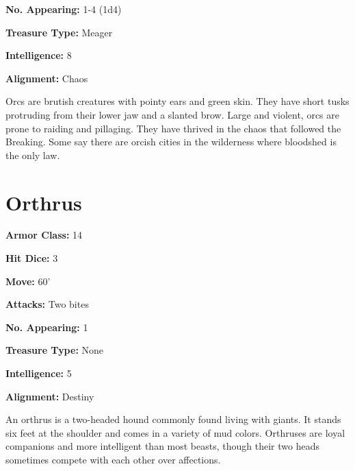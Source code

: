 \begin{multicols}{2}
\textbf{No. Appearing:} 1-4 (1d4)

\textbf{Treasure Type:} Meager

\textbf{Intelligence:} 8

\textbf{Alignment:} Chaos

Orcs are brutish creatures with pointy ears and green skin. They
have short tusks protruding from their lower jaw and a slanted
brow. Large and violent, orcs are prone to raiding and pillaging.
They have thrived in the chaos that followed the Breaking. Some
say there are orcish cities in the wilderness where bloodshed is
the only law.

\section{Orthrus}

\textbf{Armor Class:} 14

\textbf{Hit Dice:} 3

\textbf{Move:} 60'

\textbf{Attacks:} Two bites

\textbf{No. Appearing:} 1

\textbf{Treasure Type:} None

\textbf{Intelligence:} 5

\textbf{Alignment:} Destiny

An orthrus is a two-headed hound commonly found living with
giants. It stands six feet at the shoulder and comes in a
variety of mud colors. Orthruses are loyal companions and
more intelligent than most beasts, though their two heads
sometimes compete with each other over affections.

\end{multicols}

